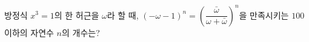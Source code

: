방정식 $x^3=1$의 한 허근을 $\omega$라 할 때, $(-\omega-1)^n=\left(\dfrac{\bar{\omega}}{\omega+\bar{\omega}}\right)^n$을 만족시키는 $100$ 이하의 자연수 $n$의 개수는? 
